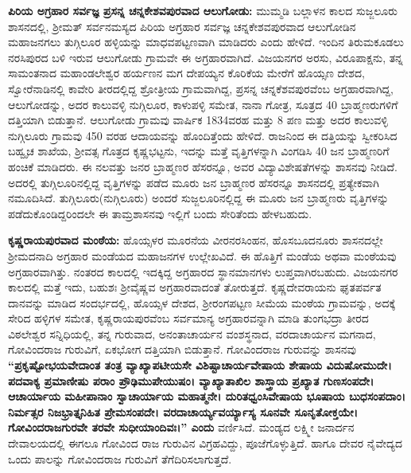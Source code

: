 \textbf{ಪಿರಿಯ ಅಗ್ರಹಾರ ಸರ್ವಜ್ಞ ಪ್ರಸನ್ನ ಚನ್ನಕೇಶವಪುರವಾದ ಆಲುಗೋಡು:} ಮುಮ್ಮಡಿ ಬಲ್ಲಾಳನ ಕಾಲದ ಸುಜ್ಜಲೂರು ಶಾಸನದಲ್ಲಿ, ಶ‍್ರೀಮತ್​ ಸರ್ವನಮಸ್ಯದ ಪಿರಿಯ ಅಗ್ರಹಾರ ಸರ್ವಜ್ಞ ಚನ್ನಕೇಶವಪುರವಾದ ಆಲುಗೋಡಿನ ಮಹಾಜನಗಲು ತುಗ್ಗಿಲೂರ ಹಳ್ಳಿಯನ್ನು ಮಾಧವಪಟ್ಟಣವಾಗಿ ಮಾಡಿದರು ಎಂದು ಹೇಳಿದೆ. ಇಂದಿನ ತಿರುಮಕೂಡಲು ನರಸಿಪುರದ ಬಳಿ ಇರುವ ಆಲುಗೋಡು ಗ್ರಾಮವೇ ಈ ಅಗ್ರಹಾರವಾಗಿದೆ. ವಿಜಯನಗರ ಅರಸು, ವಿರೂಪಾಕ್ಷನು, ತನ್ನ ಸಾಮಂತನಾದ ಮಹಾಂಡಲೇಶ್ವರ ಹರ್ಯಣನ ಮಗ ದೇಪಯ್ಯನ ಕೊರಿಕೆಯ ಮೇರೆಗೆ ಹೊಯ್ಸಣ ದೇಶದ, ಸ್ವೋರೆನಾಡಿನಲ್ಲಿ ಕಾವೇರಿ ತೀರದಲ್ಲಿದ್ದ ಶ್ರೋತ್ರೀಯ ಗ್ರಾಮವಾಗಿದ್ದ, ಪ್ರಸನ್ನ ಚನ್ನಕೆಶವಪುರವೆಂಬ ಅಗ್ರಹಾರವಾಗಿದ್ದ, ಆಲುಗೋಡನ್ನು, ಅದರ ಕಾಲುವಳ್ಳಿ ನುಗ್ಗಿಲೂರ, ಕಾಳುಪಳ್ಳಿ ಸಮೇತ, ನಾನಾ ಗೋತ್ರ, ಸೂತ್ರದ 40 ಬ್ರಾಹ್ಮಣರುಗಳಿಗೆ ದತ್ತಿಯಾಗಿ ಬಿಡುತ್ತಾನೆ. ಆಲುಗೋಡು ಗ್ರಾಮವು ವಾರ್ಷಿಕ 1834ವರಹ ಮತ್ತು 8 ಪಣ ಮತ್ತು ಅದರ ಕಾಲುವಳ್ಳಿ ನುಗ್ಗಿಲೂರು ಗ್ರಾಮವು 450 ವರಹ ಆದಾಯವನ್ನು ಹೊಂದಿತ್ತೆಂದು ಹೇಳಿದೆ. ರಾಜನಿಂದ ಈ ದತ್ತಿಯನ್ನು ಸ್ವೀಕರಿಸಿದ ಬಹ್ವೃಚ ಶಾಖೆಯ, ಶ‍್ರೀವತ್ಸ ಗೊತ್ರದ ಕೃಷ್ಣಭಟ್ಟನು, ಇದನ್ನು ಮತ್ತೆ ವೃತ್ತಿಗಳನ್ನಾಗಿ ವಿಂಗಡಿಸಿ 40 ಜನ ಬ್ರಾಹ್ಮಣರಿಗೆ ಹಂಚಿಕೆ ಮಾಡಿದರು. ಈ ನಲವತ್ತು ಜನರ ಬ್ರಾಹ್ಮಣರ ಹೆಸರನ್ನೂ, ಅವರ ವಿದ್ಯಾವಿಶೇಷತೆಗಳನ್ನು ಶಾಸನವು ನೀಡಿದೆ. ಅದರಲ್ಲಿ ತುಗ್ಗಿಲೂರಿನಲ್ಲಿದ್ದ ವೃತ್ತಿಗಳನ್ನು ಪಡೆದ ಮೂರು ಜನ ಬ್ರಾಹ್ಮಣರ ಹೆಸರನ್ನೂ ಶಾಸನದಲ್ಲಿ ಪ್ರತ್ಯೇಕವಾಗಿ ನಮೂದಿಸಿದೆ. ತುಗ್ಗಿಲೂರು(ನುಗ್ಗಿಲೂರು) ಅಂದರೆ ಸುಜ್ಜಲೂರಿನಲ್ಲಿದ್ದ ಈ ಮೂರು ಜನ ಬ್ರಾಹ್ಮಣರು ವೃತ್ತಿಗಳನ್ನು ಪಡೆದುಕೊಂಡಿದ್ದರಿಂದಲೇ ಈ ತಾಮ್ರಶಾಸನವು ಇಲ್ಲಿಗೆ ಬಂದು ಸೇರಿತೆಂದು ಹೇಳಬಹುದು.

\textbf{ಕೃಷ್ಣರಾಯಪುರವಾದ ಮಂಠೆಯ:} ಹೊಯ್ಸಳರ ಮೂರನೆಯ ವೀರನರಸಿಂಹನ, ಹೊಸಬೂದನೂರು ಶಾಸನದಲ್ಲೇ ಶ‍್ರೀಮದನಾದಿ ಅಗ್ರಹಾರ ಮಂಡೆಯದ ಮಹಾಜನಗಳ ಉಲ್ಲೇಖವಿದೆ. ಈ ಹೊತ್ತಿಗೆ ಮಂಡೆಯ ಅಥವಾ ಮಂಠೆಯವು ಅಗ್ರಹಾರವಾಗಿತ್ತು. ನಂತರದ ಕಾಲದಲ್ಲಿ ಇದಕ್ಕಿದ್ದ ಅಗ್ರಹಾರದ ಸ್ಥಾನಮಾನಗಳು ಲುಪ್ತವಾಗಿರಬಹುದು. ವಿಜಯನಗರ ಕಾಲದಲ್ಲಿ ಮತ್ತೆ ಇದು, ಬಹುಶಃ ಶ‍್ರೀವೈಷ್ಣವ ಅಗ್ರಹಾರವಾದಂತೆ ತೋರುತ್ತದೆ. ಕೃಷ್ಣದೇವರಾಯನು ಘೃತಪರ್ವತ ದಾನವನ್ನು ಮಾಡಿದ ಸಂದರ್ಭದಲ್ಲಿ, ಹೊಯ್ಸಳ ದೇಶದ, ಶ‍್ರೀರಂಗಪಟ್ಟಣ ಸೀಮೆಯ ಮಂಠೆಯ ಗ್ರಾಮವನ್ನು, ಅದಕ್ಕೆ ಸೇರಿದ ಹಳ್ಳಿಗಳ ಸಮೇತ, ಕೃಷ್ಣರಾಯಪುರವೆಂಬ ಸರ್ವಮಾನ್ಯ ಅಗ್ರಹಾರವನ್ನಾಗಿ ಮಾಡಿ ತುಂಗಭದ್ರಾ ತೀರದ ವಿಠಲೇಶ್ವರ ಸನ್ನಿಧಿಯಲ್ಲಿ, ತನ್ನ ಗುರುವಾದ, ಅನಂತಾಚಾರ್ಯನ ವಂಶಸ್ಥನಾದ, ವರದಾಚಾರ್ಯನ ಮಗನಾದ, ಗೋವಿಂದರಾಜ ಗುರುವಿಗೆ, ಏಕಭೋಗ ದತ್ತಿಯಾಗಿ ಬಿಡುತ್ತಾನೆ. ಗೋವಿಂದರಾಜ ಗುರುವನ್ನು ಶಾಸನವು \textbf{“ಪ್ರಕೃಷ್ಟೋಭಯವೇದಾಂತ ತಂತ್ರ ವ್ಯಾಖ್ಯಾಪಟೀಯಸೇ ವಿಶಿಷ್ಟಾಚಾರ್ಯವೇಷಾಯ ಶೇಷಾಯ ವಿದುಷೋಮುದೇ। ಪದವಾಕ್ಯ ಪ್ರಮಾಣೀಷು ಪರಾಂ ಪ್ರೌಢಿಮುಪೇಯುಷಂ। ವ್ಯಾಖ್ಯಾತಾಖಿಲ ಶಾಸ್ತ್ರಾಯ ಪ್ರಖ್ಯಾತ ಗುಣಸಂಪದೇ। ಆಚಾರ್ಯಾಯ ಮಹೀಪಾನಾಂ ಸ್ವಾಚಾರ್ಯಾಯ ಮಹಾತ್ಮನೇ। ದುರಿತಧ್ವಂಸಿವೇಷಾಯ ಭೂಷಾಯ ಬುಧಸಂಪದಾಂ। ನಿರ್ಮತ್ಸರ ನಿಜಭ್ರಾತ್ತೃನಿಹಿತ ಪ್ರೇಮಸಂಪದೇ। ವರದಾಚಾರ್ಯ್ಯವರ್ಯ್ಯಾಸ್ಯ ಸೂನವೇ ಸೂನೃತೋಕ್ತಯೇ। ಗೋವಿಂದರಾಜಗುರವೇ ತರವೇ ಸುಧೀಯಾಂದಿವಃ।” ಎಂದು} ವರ್ಣಿಸಿದೆ. ಮಂಡ್ಯದ ಲಕ್ಷ್ಮೀ ಜನಾರ್ದನ ದೇವಾಲಯದಲ್ಲಿ ಈಗಲೂ ಗೋವಿಂದ ರಾಜ ಗುರುವಿನ ವಿಗ್ರಹವಿದ್ದು, ಪೂಜೆಗೊಳ್ಳುತ್ತಿದೆ. ಹಾಗೂ ದೇವರ ನೈವೇದ್ಯದ ಒಂದು ಪಾಲನ್ನು ಗೋವಿಂದರಾಜ ಗುರುವಿಗೆ ತೆಗೆದಿರಿಸಲಾಗುತ್ತದೆ.

